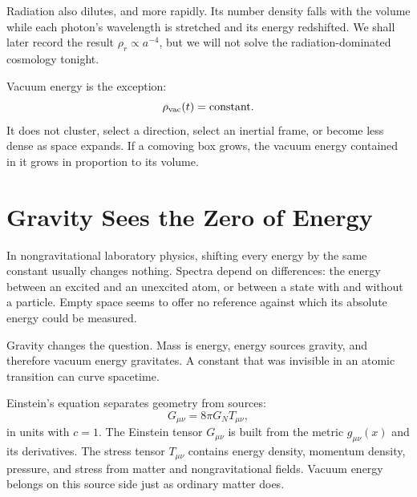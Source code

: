 Radiation also dilutes, and more rapidly. Its number density falls with the volume while each photon's wavelength is stretched and its energy redshifted. We shall later record the result \(\rho_r\propto a^{-4}\), but we will not solve the radiation-dominated cosmology tonight.

Vacuum energy is the exception:
\begin{equation}
\rho_{\rm vac}(t)=\text{constant}.
\label{eq:l08-rho-vac-constant}
\end{equation}
It does not cluster, select a direction, select an inertial frame, or become less dense as space expands. If a comoving box grows, the vacuum energy contained in it grows in proportion to its volume.


\section{Gravity Sees the Zero of Energy}

In nongravitational laboratory physics, shifting every energy by the same constant usually changes nothing. Spectra depend on differences: the energy between an excited and an unexcited atom, or between a state with and without a particle. Empty space seems to offer no reference against which its absolute energy could be measured.

Gravity changes the question. Mass is energy, energy sources gravity, and therefore vacuum energy gravitates. A constant that was invisible in an atomic transition can curve spacetime.

Einstein's equation separates geometry from sources:
\begin{equation}
G_{\mu\nu}=8\pi G_N T_{\mu\nu},
\label{eq:l08-einstein}
\end{equation}
in units with \(c=1\). The Einstein tensor \(G_{\mu\nu}\) is built from the metric \(g_{\mu\nu}(x)\) and its derivatives. The stress tensor \(T_{\mu\nu}\) contains energy density, momentum density, pressure, and stress from matter and nongravitational fields. Vacuum energy belongs on this source side just as ordinary matter does.

